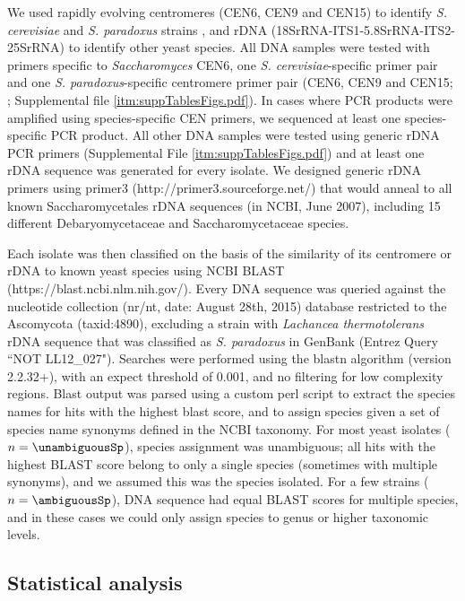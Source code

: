 \documentclass[12pt]{article}
\begin{document}
\begin{linenumbers}
We used rapidly evolving centromeres (CEN6, CEN9 and CEN15) to identify \textit{S. cerevisiae} and \textit{S. paradoxus} strains \citep{bensasson_rapid_2008}, and rDNA (18SrRNA-ITS1-5.8SrRNA-ITS2-25SrRNA) to identify other yeast species. All DNA samples were tested with primers specific to \textit{Saccharomyces} CEN6, one \textit{S. cerevisiae}-specific primer pair and one \textit{S. paradoxus}-specific centromere primer pair (CEN6, CEN9 and CEN15; \citealp{bensasson_evidence_2011}; Supplemental file \ref{itm:suppTablesFigs.pdf}). In cases where PCR products were amplified using species-specific CEN primers, we sequenced at least one species-specific PCR product. All other DNA samples were tested using generic rDNA PCR primers (Supplemental File \ref{itm:suppTablesFigs.pdf}) and at least one rDNA sequence was generated for every isolate. We designed generic rDNA primers using primer3 (http://primer3.sourceforge.net/) that would anneal to all known Saccharomycetales rDNA sequences (in NCBI, June 2007), including 15 different Debaryomycetaceae and Saccharomycetaceae species. 

Each isolate was then classified on the basis of the similarity of its centromere or rDNA to known yeast species using NCBI BLAST (https://blast.ncbi.nlm.nih.gov/). Every DNA sequence was queried against the nucleotide collection (nr/nt, date: August 28th, 2015) database restricted to the Ascomycota (taxid:4890), excluding a strain with \textit{Lachancea thermotolerans} rDNA sequence that was classified as \textit{S. paradoxus} in GenBank (Entrez Query ``NOT LL12\_027"). Searches were performed using the blastn algorithm (version 2.2.32+), with an expect threshold of 0.001, and no filtering for low complexity regions. Blast output was parsed using a custom perl script to extract the species names for hits with the highest blast score, and to assign species given a set of species name synonyms defined in the NCBI taxonomy. For most yeast isolates ($n=\unambiguousSp$), species assignment was unambiguous; all hits with the highest BLAST score belong to only a single species (sometimes with multiple synonyms), and we assumed this was the species isolated. For a few strains ($n=\ambiguousSp$), DNA sequence had equal BLAST scores for multiple species, and in these cases we could only assign species to genus or higher taxonomic levels. 


\subsection*{Statistical analysis}


\end{linenumbers}
\end{document}
